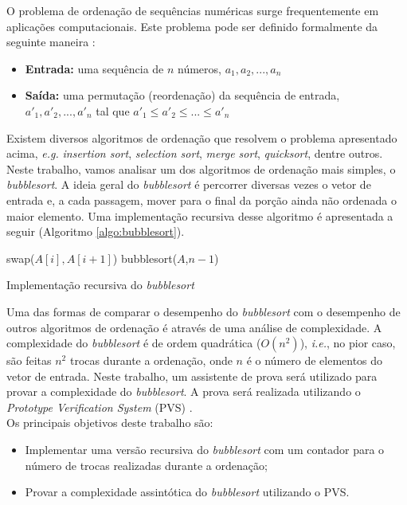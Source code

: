 O problema de ordenação de sequências numéricas surge frequentemente em aplicações computacionais. Este problema pode ser definido formalmente da seguinte maneira \cite{cormen2009introduction}:
\begin{itemize}
    \item \textbf{Entrada:} uma sequência de $n$ números, $a_1, a_2, ..., a_n$
    \item \textbf{Saída:} uma permutação (reordenação) da sequência de entrada, $a'_1, a'_2,...,a'_n$ tal que $a'_1 \leq a'_2 \leq ... \leq a'_n$ 
\end{itemize}

Existem diversos algoritmos de ordenação que resolvem o problema apresentado acima, \textit{e.g.} \textit{insertion sort}, \textit{selection sort}, \textit{merge sort}, \textit{quicksort}, dentre outros. Neste trabalho, vamos analisar um dos algoritmos de ordenação mais simples, o \textit{bubblesort}. A ideia geral do \textit{bubblesort} é percorrer diversas vezes o vetor de entrada e, a cada passagem, mover para o final da porção ainda não ordenada o maior elemento. Uma implementação recursiva desse algoritmo é apresentada a seguir (Algoritmo \ref{algo:bubblesort}).

\begin{algorithm}[!h]
    \begin{algorithmic}[1]
                \State \Return
            \EndIf
                    \State swap($A[i], A[i+1]$)
                \EndIf
            \EndFor
            \State bubblesort($A$,$n-1$)
            
        
        \EndFunction
    \end{algorithmic}\vspace{-2pt}
    \caption{Implementação recursiva do \textit{bubblesort}}
    \label{algo:bubblesort}
\end{algorithm}

Uma das formas de comparar o desempenho do \textit{bubblesort} com o desempenho de outros algoritmos de ordenação é através de uma análise de complexidade.
A complexidade do \textit{bubblesort} é de ordem quadrática ($O(n^2)$), \textit{i.e.}, no pior caso, são feitas $n^2$ trocas durante a ordenação, onde $n$ é o número de elementos do vetor de entrada.
Neste trabalho, um assistente de prova será utilizado para provar a complexidade do \textit{bubblesort}. 
A prova será realizada utilizando o \textit{Prototype Verification System} (PVS) \cite{owre1992pvs}. \\

Os principais objetivos deste trabalho são:
\begin{itemize}
    \item Implementar uma versão recursiva do \textit{bubblesort} com um contador para o número de trocas realizadas durante a ordenação;
    \item Provar a complexidade assintótica do \textit{bubblesort} utilizando o PVS.
\end{itemize}

